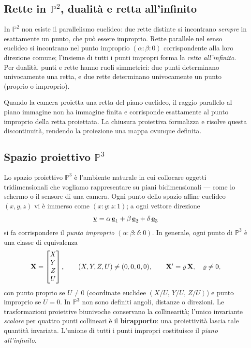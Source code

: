 \subsection{Rette in \(\mathbb{P}^2\), dualità e retta all'infinito}
\label{sub:dualita}

In \(\mathbb{P}^2\) non esiste il parallelismo euclideo: due rette
distinte si incontrano \emph{sempre} in esattamente un punto, che
può essere improprio. Rette parallele nel senso euclideo si incontrano
nel punto improprio \((\alpha:\beta:0)\) corrispondente alla loro
direzione comune; l'insieme di tutti i punti impropri forma la
\emph{retta all'infinito}. Per dualità, punti e rette hanno ruoli
simmetrici: due punti determinano univocamente una retta, e due rette
determinano univocamente un punto (proprio o improprio).

\begin{oss}
Quando la camera proietta una retta del piano euclideo, il raggio
parallelo al piano immagine non ha immagine finita e corrisponde
esattamente al punto improprio della retta proiettata.
La chiusura proiettiva formalizza e risolve questa discontinuità,
rendendo la proiezione una mappa ovunque definita.
\end{oss}

\subsection{Spazio proiettivo \(\mathbb{P}^3\)}
\label{sub:spazio_proiettivo}

Lo spazio proiettivo \(\mathbb{P}^3\) è l'ambiente naturale in cui
collocare oggetti tridimensionali che vogliamo rappresentare su piani
bidimensionali --- come lo schermo o il sensore di una camera.
Ogni punto dello spazio affine euclideo \((x,y,z)\) vi è immerso come
\((x:y:z:1)\); a ogni vettore direzione
\[
  \underline{\mathbf{v}} = \alpha\,\underline{\mathbf{e}}_1 + \beta\,\underline{\mathbf{e}}_2
             + \delta\,\underline{\mathbf{e}}_3
\]
si fa corrispondere il \emph{punto improprio} \((\alpha:\beta:\delta:0)\).
In generale, ogni punto di \(\mathbb{P}^3\) è una classe di equivalenza
\[
  \mathbf{X} =
  \begin{bmatrix} X \\ Y \\ Z \\ U \end{bmatrix},
  \qquad (X,Y,Z,U)\neq(0,0,0,0),
  \qquad
  \mathbf{X}' = \varrho\,\mathbf{X},\quad \varrho\neq 0,
\]
con punto proprio se \(U\neq 0\) (coordinate euclidee
\((X/U,\,Y/U,\,Z/U)\)) e punto improprio se \(U=0\).
In \(\mathbb{P}^3\) non sono definiti angoli, distanze o direzioni.
Le trasformazioni proiettive biunivoche conservano la collinearità;
l'unico invariante \emph{scalare} per quattro punti collineari è il
\textbf{birapporto}: una proiettività lascia tale quantità invariata.
L'unione di tutti i punti impropri costituisce il
\emph{piano all'infinito}.

